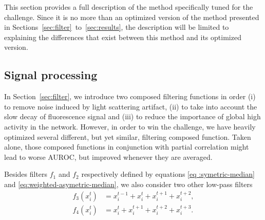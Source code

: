 \documentclass[wcp]{jmlr}
\begin{document}
This section provides a full description of the method specifically tuned for
the challenge. Since it is no more than an optimized version of the method
presented in Sections~\ref{sec:filter}~to~\ref{sec:results}, the description
will be limited to explaining the differences that exist between this method
and its optimized version.



\subsection*{Signal processing}

In Section~\ref{sec:filter}, we introduce two composed filtering functions in
order (i) to remove noise induced by light scattering artifact, (ii) to take
into account the slow decay of fluorescence signal and (iii) to reduce the
importance of global high activity in the network. However, in order to win the
challenge, we have heavily optimized several different, but yet similar,
filtering composed function. Taken alone, those composed functions in
conjunction with partial correlation might lead to worse AUROC, but improved
whenever they are averaged.

Besides filters $f_1$ and $f_2$ respectively defined by equations \ref{eq
:symetric-median} and \ref{eq:weighted-asymetric-median}, we also consider two
other low-pass filters
\begin{align}
f_3(x^t_i) &= x^{t-1}_i + x^{t}_i + x^{t+1}_i + x^{t+2}_i, \label{eq:asymetric-median-forward} \\
f_4(x^t_i) &=  x_i^t + x^{t+1}_i  + x^{t+2}_i + x^{t+3}_i. \label{eq:asymetric-median}
\end{align}
\end{document}
